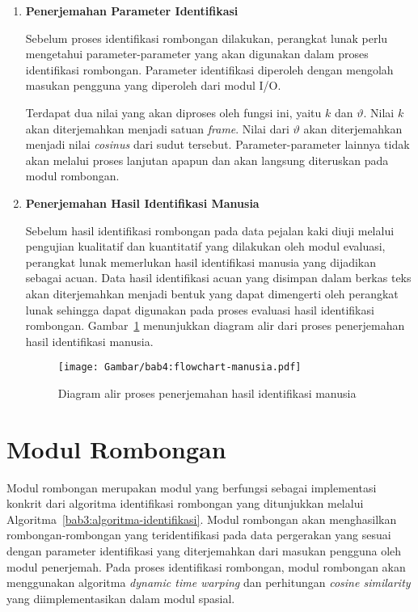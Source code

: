 \begin{enumerate}
    \item \textbf{Penerjemahan Parameter Identifikasi}
    
    Sebelum proses identifikasi rombongan dilakukan, perangkat lunak perlu mengetahui parameter-parameter yang akan digunakan dalam proses identifikasi rombongan. Parameter identifikasi diperoleh dengan mengolah masukan pengguna yang diperoleh dari modul I/O.
    
    Terdapat dua nilai yang akan diproses oleh fungsi ini, yaitu $k$ dan $\vartheta$. Nilai $k$ akan diterjemahkan menjadi satuan \textit{frame}. Nilai dari $\vartheta$ akan diterjemahkan menjadi nilai \textit{cosinus} dari sudut tersebut. Parameter-parameter lainnya tidak akan melalui proses lanjutan apapun dan akan langsung diteruskan pada modul rombongan.
    
    \item \textbf{Penerjemahan Hasil Identifikasi Manusia}
    
    Sebelum hasil identifikasi rombongan pada data pejalan kaki diuji melalui pengujian kualitatif dan kuantitatif yang dilakukan oleh modul evaluasi, perangkat lunak memerlukan hasil identifikasi manusia yang dijadikan sebagai acuan. Data hasil identifikasi acuan yang disimpan dalam berkas teks akan diterjemahkan menjadi bentuk yang dapat dimengerti oleh perangkat lunak sehingga dapat digunakan pada proses evaluasi hasil identifikasi rombongan. Gambar~\ref{bab4:flowchart-manusia} menunjukkan diagram alir dari proses penerjemahan hasil identifikasi manusia.
    
    \begin{figure}[h]
        \centering
        \texttt{[image: Gambar/bab4:flowchart-manusia.pdf]}
        \caption{Diagram alir proses penerjemahan hasil identifikasi manusia}
        \label{bab4:flowchart-manusia}
    \end{figure}
\end{enumerate}

\section{Modul Rombongan}
\label{sec:des-rombongan}

Modul rombongan merupakan modul yang berfungsi sebagai implementasi konkrit dari algoritma identifikasi rombongan yang ditunjukkan melalui Algoritma~\ref{bab3:algoritma-identifikasi}. Modul rombongan akan menghasilkan rombongan-rombongan yang teridentifikasi pada data pergerakan yang sesuai dengan parameter identifikasi yang diterjemahkan dari masukan pengguna oleh modul penerjemah. Pada proses identifikasi rombongan, modul rombongan akan menggunakan algoritma \textit{dynamic time warping} dan perhitungan \textit{cosine similarity} yang diimplementasikan dalam modul spasial.

